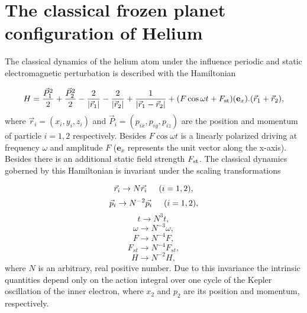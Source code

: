 \section{The classical frozen planet configuration of Helium}

The classical dynamics of the helium atom under the influence periodic and static electromagnetic perturbation is described with the Hamiltonian

\begin{equation}
	H=\frac{\vec{P}_{1}^{2}}{2}+\frac{\vec{P}_{2}^{2}}{2}-\frac{2}{\abs{\vec{r}_{1}}}-\frac{2}{\abs{\vec{r}_{2}}}+\frac{1}{\abs{\vec{r}_{1}-\vec{r}_{2}}}+(F \cos \omega t +F_{\textrm{st}})(\textbf{e}_{x}).(\vec{r}_{1}+\vec{r}_{2}), 
\end{equation}
where $ \vec{r}_{i}=(x_{i},y_{i},z_{i}) $ and $ \vec{P}_{i}=(p_{ix},p_{iy},p_{iz}) $ are the position and momentum of particle $ i=1,2 $ respectively. Besides $ F \cos\omega t $ is a linearly polarized driving at frequency $ \omega $ and amplitude $ F $ ($ \textbf{e}_{x} $ represents the unit vector along the x-axis). Besides there is an additional static field strength $ F_{\rm st} $. The classical dynamics goberned by this Hamiltonian is invariant under the scaling transformations

\begin{equation}
	\vec{r}_{i} \rightarrow  N \vec{r_{i}} \hspace{0.5cm} (i=1,2),
\end{equation}
\begin{equation}
\vec{p}_{i} \rightarrow  N^{-2} \vec{p_{i}} \hspace{0.5cm} (i=1,2),
\end{equation}
\begin{equation}
t \rightarrow  N^{3} t,
\end{equation}
\begin{equation}
\omega \rightarrow  N^{-3} \omega,
\end{equation}
\begin{equation}
F \rightarrow  N^{-4} F,
\end{equation}
\begin{equation}
F_{st} \rightarrow  N^{-4} F_{st},
\end{equation}
\begin{equation}
H \rightarrow  N^{-2} H,
\end{equation}
where $ N $ is an arbitrary, real positive number. Due to this invariance the intrinsic quantities depend only on the action integral over one cycle of the Kepler oscillation of the inner electron, where $ x_{2} $ and $ p_{2} $ are its position and momentum, respectively.

